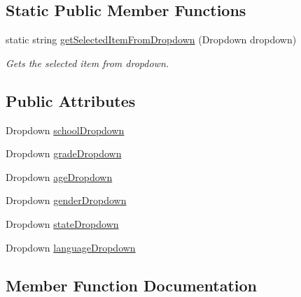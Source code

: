 \subsection*{Static Public Member Functions}
\begin{DoxyCompactItemize}
\item 
static string \hyperlink{classRegisterScene2Controller_af1feeaeba8930f9827973c2e36ec5f81}{get\+Selected\+Item\+From\+Dropdown} (Dropdown dropdown)
\begin{DoxyCompactList}\small\item\em Gets the selected item from dropdown. \end{DoxyCompactList}\end{DoxyCompactItemize}
\subsection*{Public Attributes}
\begin{DoxyCompactItemize}
\item 
Dropdown \hyperlink{classRegisterScene2Controller_a7e3c77b68cd5c7df29579ef2862b476b}{school\+Dropdown}
\item 
Dropdown \hyperlink{classRegisterScene2Controller_a58649b4717df71ce7b09190869dbc49d}{grade\+Dropdown}
\item 
Dropdown \hyperlink{classRegisterScene2Controller_ae7e20a03f95902610cace5ab23b08005}{age\+Dropdown}
\item 
Dropdown \hyperlink{classRegisterScene2Controller_a433c2daa9919ddc9116d0db771f59714}{gender\+Dropdown}
\item 
Dropdown \hyperlink{classRegisterScene2Controller_ae3a80578aa69ac34d7976db3d6181213}{state\+Dropdown}
\item 
Dropdown \hyperlink{classRegisterScene2Controller_ac6b5c732f6aa13081d42af0522022c4e}{language\+Dropdown}
\end{DoxyCompactItemize}


\subsection{Member Function Documentation}
\mbox{\label{classRegisterScene2Controller_aa22760985ecf5d5fad51395e9925e825}} 

